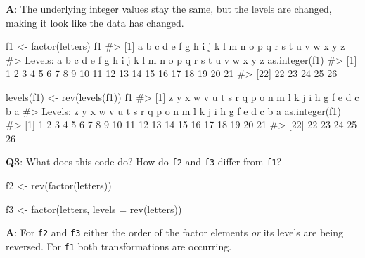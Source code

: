 \documentclass[
]{krantz}
\makeatletter
\newenvironment{Shaded}{\begin{snugshade}}{\end{snugshade}}
\newcommand{\CommentTok}[1]{\textcolor[rgb]{0.56,0.35,0.01}{\textit{#1}}}
\newcommand{\DataTypeTok}[1]{\textcolor[rgb]{0.13,0.29,0.53}{#1}}
\newcommand{\KeywordTok}[1]{\textcolor[rgb]{0.13,0.29,0.53}{\textbf{#1}}}
\newcommand{\NormalTok}[1]{#1}
\newcommand{\StringTok}[1]{\textcolor[rgb]{0.31,0.60,0.02}{#1}}
\newenvironment{kframe}{%
\medskip{}
\setlength{\fboxsep}{.8em}
 \def\at@end@of@kframe{}%
 \ifinner\ifhmode%
  \def\at@end@of@kframe{\end{minipage}}%
  \begin{minipage}{\columnwidth}%
 \fi\fi%
 \def\FrameCommand##1{\hskip\@totalleftmargin \hskip-\fboxsep
 \colorbox{shadecolor}{##1}\hskip-\fboxsep
     \hskip-\linewidth \hskip-\@totalleftmargin \hskip\columnwidth}%
 \MakeFramed {\advance\hsize-\width
   \@totalleftmargin\z@ \linewidth\hsize
   \@setminipage}}%
 {\par\unskip\endMakeFramed%
 \at@end@of@kframe}
\renewenvironment{Shaded}{\begin{kframe}}{\end{kframe}}
\renewcommand{\KeywordTok} [1]{\textcolor[rgb]{0.00,0.44,0.13}{{#1}}}
\renewcommand{\DataTypeTok}[1]{\textcolor[rgb]{0.56,0.13,0.00}{{#1}}}
\renewcommand{\StringTok}  [1]{\textcolor[rgb]{0.25,0.44,0.63}{{#1}}}
\renewcommand{\CommentTok} [1]{\textcolor[rgb]{0.38,0.63,0.69}{{#1}}}
\renewcommand{\NormalTok}  [1]{{#1}}
\makeatother
\begin{document}
\textbf{{A}}: The underlying integer values stay the same, but the levels are changed, making it look like the data has changed.

\begin{Shaded}
\begin{Highlighting}[]
\NormalTok{f1 <-}\StringTok{ }\KeywordTok{factor}\NormalTok{(letters)}
\NormalTok{f1}
\CommentTok{#>  [1] a b c d e f g h i j k l m n o p q r s t u v w x y z}
\CommentTok{#> Levels: a b c d e f g h i j k l m n o p q r s t u v w x y z}
\KeywordTok{as.integer}\NormalTok{(f1)}
\CommentTok{#>  [1]  1  2  3  4  5  6  7  8  9 10 11 12 13 14 15 16 17 18 19 20 21}
\CommentTok{#> [22] 22 23 24 25 26}

\KeywordTok{levels}\NormalTok{(f1) <-}\StringTok{ }\KeywordTok{rev}\NormalTok{(}\KeywordTok{levels}\NormalTok{(f1))}
\NormalTok{f1}
\CommentTok{#>  [1] z y x w v u t s r q p o n m l k j i h g f e d c b a}
\CommentTok{#> Levels: z y x w v u t s r q p o n m l k j i h g f e d c b a}
\KeywordTok{as.integer}\NormalTok{(f1)}
\CommentTok{#>  [1]  1  2  3  4  5  6  7  8  9 10 11 12 13 14 15 16 17 18 19 20 21}
\CommentTok{#> [22] 22 23 24 25 26}
\end{Highlighting}
\end{Shaded}

\textbf{{Q3}}: What does this code do? How do \texttt{f2} and \texttt{f3} differ from \texttt{f1}?

\begin{Shaded}
\begin{Highlighting}[]
\NormalTok{f2 <-}\StringTok{ }\KeywordTok{rev}\NormalTok{(}\KeywordTok{factor}\NormalTok{(letters))}

\NormalTok{f3 <-}\StringTok{ }\KeywordTok{factor}\NormalTok{(letters, }\DataTypeTok{levels =} \KeywordTok{rev}\NormalTok{(letters))}
\end{Highlighting}
\end{Shaded}

\textbf{{A}}: For \texttt{f2} and \texttt{f3} either the order of the factor elements \emph{or} its levels are being reversed. For \texttt{f1} both transformations are occurring.
\end{document}
